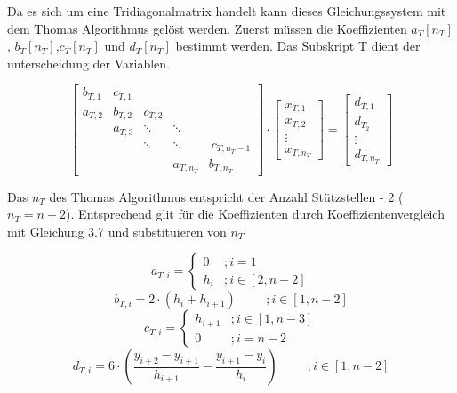 \documentclass[12pt,titlepage]{article}
\begin{document}
Da es sich um eine Tridiagonalmatrix handelt kann dieses Gleichungssystem mit dem Thomas Algorithmus gelöst werden. Zuerst müssen die Koeffizienten $a_T[n_T]$, $b_T[n_T]$,$c_T[n_T]$ und $d_T[n_T]$ bestimmt werden. Das Subskript T dient der unterscheidung der Variablen.
\newline

\begin{equation}
    \begin{bmatrix}
        b_{T,1} & c_{T,1}\\
        a_{T,2} & b_{T,2} & c_{T,2} \\
        & a_{T,3} & \ddots & \ddots \\ 
        && \ddots & \ddots &\ c_{T,n_T-1}\\
        &&& a_{T,n_T} & b_{T,n_T}
    \end{bmatrix}
    \cdot
    \begin{bmatrix}
        x_{T,1}\\
        x_{T,2}\\
        \vdots\\ 
        x_{T,n_T}
    \end{bmatrix}
    =
    \begin{bmatrix}
        d_{T,1}\\
        d_{T_2} \\
        \vdots\\ 
        d_{T,n_T}
    \end{bmatrix}
\end{equation}
\newline

Das $n_T$ des Thomas Algorithmus entspricht der Anzahl Stützstellen - 2 ($n_T = n-2$). Entsprechend glit für die Koeffizienten durch Koeffizientenvergleich mit Gleichung 3.7 und substituieren von  $n_T$
\newline

\begin{equation*}
    a_{T,i} =
    \begin{cases}
        0 & ;i=1\\
        h_i & ;i\in [2,n-2]
    \end{cases}
\end{equation*}
\newline
\begin{equation*}
    b_{T,i} = 2\cdot (h_i+h_{i+1}) \hspace{1cm} ;i\in [1,n-2]
\end{equation*}
\newline
\begin{equation*}
    c_{T,i} = 
    \begin{cases}
        h_{i+1} & ;i\in [1,n-3]\\
        0 & ;i=n-2
    \end{cases}
\end{equation*}
\newline
\begin{equation}
    d_{T,i} = 6\cdot \left(\frac{y_{i+2}-y_{i+1}}{h_{i+1}}-\frac{y_{i+1}-y_i}{h_i}\right) \hspace{1cm} ;i\in [1,n-2]
\end{equation}
\newline
\end{document}

